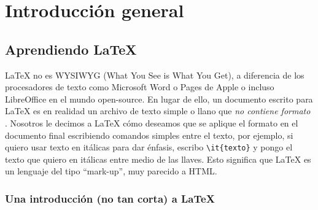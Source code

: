 
\chapter{Introducción general} %

\label{Chapter1} %
\label{IntroGeneral}


\newcommand{\keyword}[1]{\textbf{#1}}
\newcommand{\tabhead}[1]{\textbf{#1}}
\newcommand{\code}[1]{\texttt{#1}}
\newcommand{\file}[1]{\texttt{\bfseries#1}}
\newcommand{\option}[1]{\texttt{\itshape#1}}
\newcommand{\grados}{$^{\circ}$}



\section{Aprendiendo \LaTeX{}}

\LaTeX{} no es \textsc{WYSIWYG} (What You See is What You Get), a diferencia de los procesadores de texto como Microsoft Word o Pages de Apple o incluso LibreOffice en el mundo open-source. En lugar de ello, un documento escrito para \LaTeX{} es en realidad un archivo de texto simple o llano que \emph{no contiene formato} . Nosotros le decimos a \LaTeX{} cómo deseamos que se aplique el formato en el documento final escribiendo comandos simples entre el texto, por ejemplo, si quiero usar texto en itálicas para dar énfasis, escribo \verb|\it{texto}| y pongo el texto que quiero en itálicas entre medio de las llaves. Esto significa que \LaTeX{} es un lenguaje del tipo \enquote{mark-up}, muy parecido a HTML.

\subsection{Una introducción (no tan corta) a \LaTeX{}}

